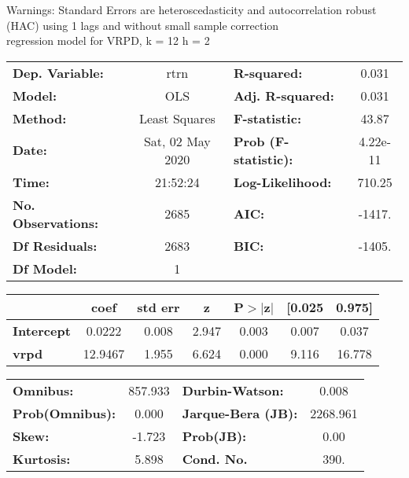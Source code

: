 Warnings: \newline
 [1] Standard Errors are heteroscedasticity and autocorrelation robust (HAC) using 1 lags and without small sample correction\\ 

regression model for VRPD, k = 12 h = 2\begin{center}
\begin{tabular}{lclc}
\toprule
\textbf{Dep. Variable:}    &       rtrn       & \textbf{  R-squared:         } &     0.031   \\
\textbf{Model:}            &       OLS        & \textbf{  Adj. R-squared:    } &     0.031   \\
\textbf{Method:}           &  Least Squares   & \textbf{  F-statistic:       } &     43.87   \\
\textbf{Date:}             & Sat, 02 May 2020 & \textbf{  Prob (F-statistic):} &  4.22e-11   \\
\textbf{Time:}             &     21:52:24     & \textbf{  Log-Likelihood:    } &    710.25   \\
\textbf{No. Observations:} &        2685      & \textbf{  AIC:               } &    -1417.   \\
\textbf{Df Residuals:}     &        2683      & \textbf{  BIC:               } &    -1405.   \\
\textbf{Df Model:}         &           1      & \textbf{                     } &             \\
\bottomrule
\end{tabular}
\begin{tabular}{lcccccc}
                   & \textbf{coef} & \textbf{std err} & \textbf{z} & \textbf{P$> |$z$|$} & \textbf{[0.025} & \textbf{0.975]}  \\
\midrule
\textbf{Intercept} &       0.0222  &        0.008     &     2.947  &         0.003        &        0.007    &        0.037     \\
\textbf{vrpd}      &      12.9467  &        1.955     &     6.624  &         0.000        &        9.116    &       16.778     \\
\bottomrule
\end{tabular}
\begin{tabular}{lclc}
\textbf{Omnibus:}       & 857.933 & \textbf{  Durbin-Watson:     } &    0.008  \\
\textbf{Prob(Omnibus):} &   0.000 & \textbf{  Jarque-Bera (JB):  } & 2268.961  \\
\textbf{Skew:}          &  -1.723 & \textbf{  Prob(JB):          } &     0.00  \\
\textbf{Kurtosis:}      &   5.898 & \textbf{  Cond. No.          } &     390.  \\
\bottomrule
\end{tabular}
\end{center}

